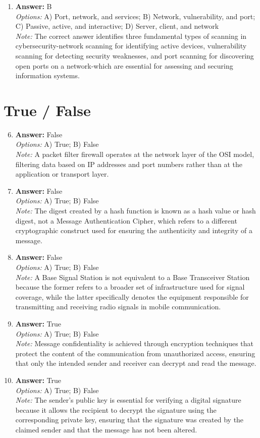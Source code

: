 \documentclass[12pt]{article}
\begin{document}
\begin{enumerate}[label=\arabic*.]
\item \textbf{Answer:} B
\\ \textit{Options:} A) Port, network, and services; B) Network, vulnerability, and port; C) Passive, active, and interactive; D) Server, client, and network
\\ \textit{Note:} The correct answer identifies three fundamental types of scanning in cybersecurity-network scanning for identifying active devices, vulnerability scanning for detecting security weaknesses, and port scanning for discovering open ports on a network-which are essential for assessing and securing information systems.
\end{enumerate}

\section*{True / False}
\begin{enumerate}[label=\arabic*.]
\setcounter{enumi}{5}
\item \textbf{Answer:} False
\\ \textit{Options:} A) True; B) False
\\ \textit{Note:} A packet filter firewall operates at the network layer of the OSI model, filtering data based on IP addresses and port numbers rather than at the application or transport layer.
\item \textbf{Answer:} False
\\ \textit{Options:} A) True; B) False
\\ \textit{Note:} The digest created by a hash function is known as a hash value or hash digest, not a Message Authentication Cipher, which refers to a different cryptographic construct used for ensuring the authenticity and integrity of a message.
\item \textbf{Answer:} False
\\ \textit{Options:} A) True; B) False
\\ \textit{Note:} A Base Signal Station is not equivalent to a Base Transceiver Station because the former refers to a broader set of infrastructure used for signal coverage, while the latter specifically denotes the equipment responsible for transmitting and receiving radio signals in mobile communication.
\item \textbf{Answer:} True
\\ \textit{Options:} A) True; B) False
\\ \textit{Note:} Message confidentiality is achieved through encryption techniques that protect the content of the communication from unauthorized access, ensuring that only the intended sender and receiver can decrypt and read the message.
\item \textbf{Answer:} True
\\ \textit{Options:} A) True; B) False
\\ \textit{Note:} The sender's public key is essential for verifying a digital signature because it allows the recipient to decrypt the signature using the corresponding private key, ensuring that the signature was created by the claimed sender and that the message has not been altered.
\end{enumerate}
\end{document}
